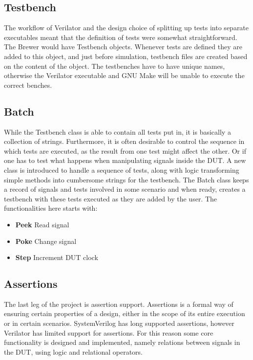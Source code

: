 \subsection{Testbench}
The workflow of Verilator and the design choice of splitting up tests into separate executables meant that the definition of tests were somewhat straightforward. The Brewer would have Testbench objects. Whenever tests are defined they are added to this object, and just before simulation, testbench files are created based on the content of the object. The testbenches have to have unique names, otherwise the Verilator executable and GNU Make will be unable to execute the correct benches.
\subsection{Batch}
While the Testbench class is able to contain all tests put in, it is basically a collection of strings. Furthermore, it is often desirable to control the sequence in which tests are executed, as the result from one test might affect the other. Or if one has to test what happens when manipulating signals inside the DUT. A new class is introduced to handle a sequence of tests, along with logic transforming simple methods into cumbersome strings for the testbench. The Batch class keeps a record of signals and tests involved in some scenario and when ready, creates a testbench with these tests executed as they are added by the user.
The functionalities here starts with:
\begin{itemize}
    \item \textbf{Peek} Read signal
    \item \textbf{Poke} Change signal
    \item \textbf{Step} Increment DUT clock
\end{itemize}
\subsection{Assertions}
The last leg of the project is assertion support. Assertions is a formal way of ensuring certain properties of a design, either in the scope of its entire execution or in certain scenarios. SystemVerilog has long supported assertions, however Verilator has limited support for assertions. For this reason some core functionality is designed and implemented, namely relations between signals in the DUT, using logic and relational operators.
